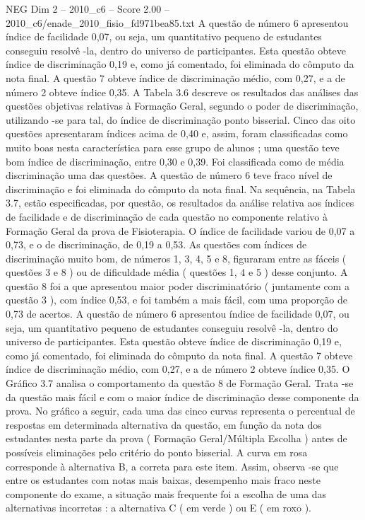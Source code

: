 \begin{textsample}{NEG Dim 2 – 2010\_c6 – Score 2.00 – 2010\_c6/enade\_2010\_fisio\_fd971bea85.txt}
A questão de número 6 apresentou índice de facilidade 0,07, ou seja, um quantitativo pequeno de estudantes conseguiu resolvê -la, dentro do universo de participantes.
Esta questão obteve índice de discriminação 0,19 e, como já comentado, foi eliminada do cômputo da nota final.
A questão 7 obteve índice de discriminação médio, com 0,27, e a de número 2 obteve índice 0,35.
A Tabela 3.6 descreve os resultados das análises das questões objetivas relativas à Formação Geral, segundo o poder de discriminação, utilizando -se para tal, do índice de discriminação ponto bisserial.
Cinco das oito questões apresentaram índices acima de 0,40 e, assim, foram classificadas como muito boas nesta característica para esse grupo de alunos ; uma questão teve bom índice de discriminação, entre 0,30 e 0,39.
Foi classificada como de média discriminação uma das questões.
A questão de número 6 teve fraco nível de discriminação e foi eliminada do cômputo da nota final.
Na sequência, na Tabela 3.7, estão especificadas, por questão, os resultados da análise relativa aos índices de facilidade e de discriminação de cada questão no componente relativo à Formação Geral da prova de Fisioterapia.
O índice de facilidade variou de 0,07 a 0,73, e o de discriminação, de 0,19 a 0,53.
As questões com índices de discriminação muito bom, de números 1, 3, 4, 5 e 8, figuraram entre as fáceis ( questões 3 e 8 ) ou de dificuldade média ( questões 1, 4 e 5 ) desse conjunto.
A questão 8 foi a que apresentou maior poder discriminatório ( juntamente com a questão 3 ), com índice 0,53, e foi também a mais fácil, com uma proporção de 0,73 de acertos.
A questão de número 6 apresentou índice de facilidade 0,07, ou seja, um quantitativo pequeno de estudantes conseguiu resolvê -la, dentro do universo de participantes.
Esta questão obteve índice de discriminação 0,19 e, como já comentado, foi eliminada do cômputo da nota final.
A questão 7 obteve índice de discriminação médio, com 0,27, e a de número 2 obteve índice 0,35.
O Gráfico 3.7 analisa o comportamento da questão 8 de Formação Geral.
Trata -se da questão mais fácil e com o maior índice de discriminação desse componente da prova.
No gráfico a seguir, cada uma das cinco curvas representa o percentual de respostas em determinada alternativa da questão, em função da nota dos estudantes nesta parte da prova ( Formação Geral/Múltipla Escolha ) antes de possíveis eliminações pelo critério do ponto bisserial.
A curva em rosa corresponde à alternativa B, a correta para este item.
Assim, observa -se que entre os estudantes com notas mais baixas, desempenho mais fraco neste componente do exame, a situação mais frequente foi a escolha de uma das alternativas incorretas : a alternativa C ( em verde ) ou E ( em roxo ).

\end{textsample}
